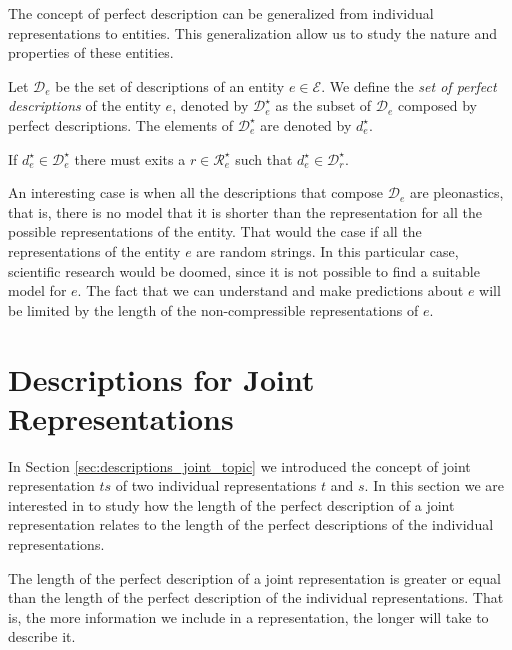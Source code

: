 The concept of perfect description can be generalized from individual representations to entities. This generalization allow us to study the nature and properties of these entities.

\begin{definition}
\label{def:entities_perfect_model}
Let $\mathcal{D}_e$ be the set of descriptions of an entity $e \in \mathcal{E}$. We define the \emph{set of perfect descriptions} of the entity $e$, denoted by $\mathcal{D}^\star_e$ as the subset of $\mathcal{D}_e$ composed by perfect descriptions. The elements of $\mathcal{D}^\star_e$ are denoted by $d^\star_e$.
\end{definition}

If $d^\star_e \in \mathcal{D}^\star_e$ there must exits a $r \in \mathcal{R}^\star_e$ such that $d^\star_e \in \mathcal{D}^\star_r$.

An interesting case is when all the descriptions that compose $\mathcal{D}_e$ are pleonastics, that is, there is no model that it is shorter than the representation for all the possible representations of the entity. That would the case if all the representations of the entity $e$ are random strings. In this particular case, scientific research would be doomed, since it is not possible to find a suitable model for $e$. The fact that we can understand and make predictions about $e$ will be limited by the length of the non-compressible representations of $e$.


%
%

\section{Descriptions for Joint Representations}
\label{sec:description_joint_represenation}

In Section \ref{sec:descriptions_joint_topic} we introduced the concept of joint representation $ts$ of two individual representations $t$ and $s$. In this section we are interested in to study how the length of the perfect description of a joint representation relates to the length of the perfect descriptions of the individual representations.

The length of the perfect description of a joint representation is greater or equal than the length of the perfect description of the individual representations. That is, the more information we include in a representation, the longer will take to describe it. 

